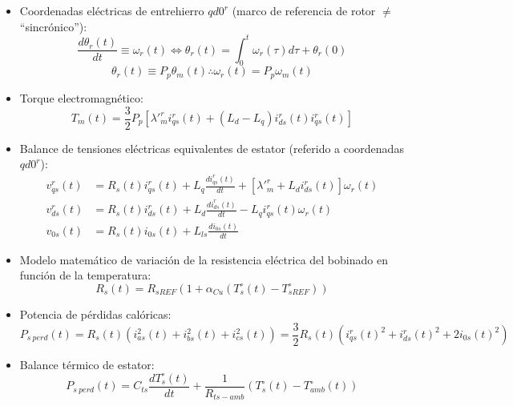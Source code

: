 \documentclass[a4paper, 10pt, onecolumn,journal]{ieeeconf}
\begin{document}
\begin{itemize}
    \item Coordenadas eléctricas de entrehierro $qd0^{r}$ (marco de referencia de rotor $\neq$ “sincrónico”):
    \begin{equation}
        \frac{d\theta_r(t)}{dt} \equiv \omega_r(t) \Leftrightarrow \theta_r(t) = \int_{0}^{t} \omega_r(\tau) d\tau + \theta_r(0)
        \label{Relacion coordenadas electricas y mecanicas}
    \end{equation}
    \begin{equation}
        \theta_r(t) \equiv P_p \theta_m(t) \therefore  \omega_r(t) = P_p \omega_m(t)
        \label{posicion y velocidad rotor}
    \end{equation}
    \item Torque electromagnético:
    \begin{equation}
        T_m(t) = \frac{3}{2} P_p [\lambda'^r_{m} i^r_{qs}(t) + (L_d - L_q) i^r_{ds}(t) i^r_{qs}(t)]
        \label{torque electromagnetico}
    \end{equation}
    \item Balance de tensiones eléctricas equivalentes de estator (referido a coordenadas $qd0^{r}$):
    \begin{align}
        v^r_{qs}(t) &= R_s(t) i^r_{qs}(t) + L_q \frac{di^r_{qs}(t)}{dt} + [\lambda'^r_{m} + L_d i^r_{ds}(t)] \omega_r(t)
        \label{balance de tensiones q}\\
        v^r_{ds}(t) &= R_s(t) i^r_{ds}(t) + L_d \frac{di^r_{ds}(t)}{dt} - L_q i^r_{qs}(t) \omega_r(t)
        \label{balance de tensiones d}\\
        v_{0s}(t) &= R_s(t) i_{0s}(t) + L_{ls} \frac{di_{0s}(t)}{dt}
        \label{balance de tensiones 0}
    \end{align}

    \item Modelo matemático de variación de la resistencia eléctrica del bobinado en función de la temperatura:
    \begin{equation}
        R_s(t) = R_{sREF} \left(1 + \alpha_{Cu} (T_s^{\circ}(t) - T_{sREF}^{\circ})\right)
        \label{Rs}
    \end{equation}

    \item Potencia de pérdidas calóricas:
    \begin{equation}
        P_{s\ perd}(t) = R_s(t) \left(i_{as}^2(t) + i_{bs}^2(t) + i_{cs}^2(t)\right) = \frac{3}{2} R_s(t) \left({i^r_{qs}(t)}^2 + {i^r_{ds}(t)}^2 + 2 {i_{0s}(t)}^2\right)
        \label{potencia de perdidas}
    \end{equation}
    \item Balance térmico de estator:
    \begin{equation}
        P_{s\ perd}(t) = C_{ts} \frac{dT_s^{\circ}(t)}{dt} + \frac{1}{R_{ts-amb}} \left(T_s^{\circ}(t) - T_{amb}^{\circ}(t)\right)
        \label{balance termico estator}
    \end{equation}


\end{itemize}
\end{document}
